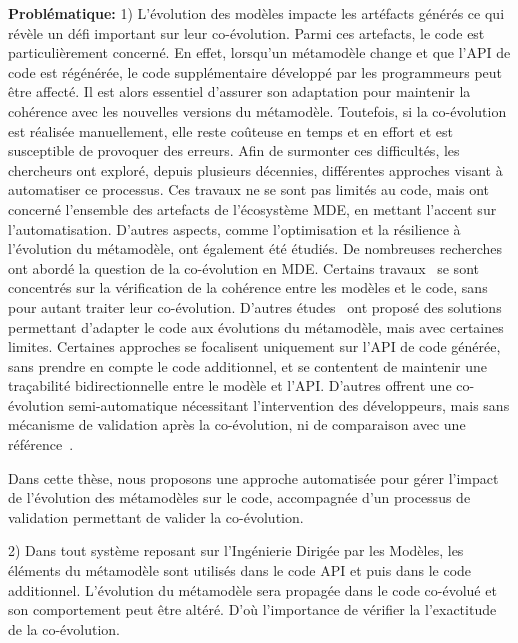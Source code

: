 \textbf{Problématique:} 1) L’évolution des modèles impacte les artéfacts générés ce qui révèle un défi important sur leur co-évolution. Parmi ces artefacts, le code est particulièrement concerné. En effet, lorsqu’un métamodèle change et que l’API de code est régénérée, le code supplémentaire développé par les programmeurs peut être affecté. Il est alors essentiel d’assurer son adaptation pour maintenir la cohérence avec les nouvelles versions du métamodèle. Toutefois, si la co-évolution est réalisée manuellement, elle reste coûteuse en temps et en effort et est susceptible de provoquer des erreurs.
Afin de surmonter ces difficultés, les chercheurs ont exploré, depuis plusieurs décennies, différentes approches visant à automatiser ce processus. Ces travaux ne se sont pas limités au code, mais ont concerné l’ensemble des artefacts de l’écosystème MDE, en mettant l'accent sur l’automatisation. D’autres aspects, comme l’optimisation et la résilience à l'évolution du métamodèle, ont également été étudiés. 
De nombreuses recherches ont abordé la question de la co-évolution en MDE. Certains travaux~\cite{riedl2014towards,kanakis2019empirical,pham2017bidirectional,jongeling2020towards,jongeling2022Structural,zaheri2021towards} se sont concentrés sur la vérification de la cohérence entre les modèles et le code, sans pour autant traiter leur co-évolution. D’autres études~\cite{yu2012maintaining,Khelladi2020} ont proposé des solutions permettant d’adapter le code aux évolutions du métamodèle, mais avec certaines limites. Certaines approches se focalisent uniquement sur l’API de code générée, sans prendre en compte le code additionnel, et se contentent de maintenir une traçabilité bidirectionnelle entre le modèle et l’API. D’autres offrent une co-évolution semi-automatique nécessitant l’intervention des développeurs, mais sans mécanisme de validation après la co-évolution, ni de comparaison avec une référence~\cite{9079197,10.5555/2486788.2486855,6062100,dagenais2011recommending,5070565,henkel2005catchup,10.1145/1932682.1869486,10.1145/3194793.3194798,Khelladi2020}.

Dans cette thèse, nous proposons une approche automatisée pour gérer l’impact de l’évolution des métamodèles sur le code, accompagnée d’un processus de validation permettant de valider la co-évolution.

2) Dans tout système reposant sur l’Ingénierie Dirigée par les Modèles, les éléments du métamodèle sont utilisés dans le code API et puis dans le code additionnel. L’évolution du métamodèle sera propagée dans le code co-évolué et son comportement peut être altéré. D’où l’importance de vérifier la l'exactitude de la co-évolution. 

